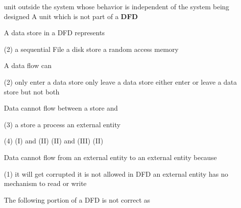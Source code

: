 \documentclass{article}
\begin{document}
\begin{questions}
\begin{exercise}
\begin{choice}
            \choice unit outside the system whose behavior is independent of the system being designed
            \choice {}
            \choice A unit which is not part of a \textbf{DFD}
        \end{choice}
    \end{exercise}
    \begin{exercise}
        A data store in a DFD represents
        \begin{choice}(2)
            \choice a sequential File
            \choice a disk store
            \choice {}
            \choice a random access memory
        \end{choice}
    \end{exercise}
    \begin{exercise}
        A data flow can
        \begin{choice}(2)
            \choice only enter a data store
            \choice only leave a data store
            \choice {}
            \choice either enter or leave a data store but not both
        \end{choice}
    \end{exercise}
    \begin{exercise}
        Data cannot flow between a store and
        \begin{tasks}(3)
            \task a store
            \task a process
            \task an external entity
        \end{tasks}
        \begin{choice}(4)
            \choice {}
            \choice (I) and (II)
            \choice (II) and (III)
            \choice (II)
        \end{choice}
    \end{exercise}
    \begin{exercise}
        Data cannot flow from an external entity to an external entity because
        \begin{choice}(1)
            \choice it will get corrupted
            \choice it is not allowed in DFD
            \choice an external entity has no mechanism to read or write
            \choice {}
        \end{choice}
    \end{exercise}
    \begin{exercise}
        The following portion of a DFD is not correct as


\end{exercise}
\end{questions}
\end{document}
